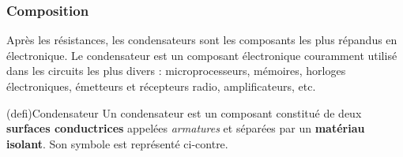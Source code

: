 \documentclass[../../main/main.tex]{subfiles}
\begin{document}
\subsubsection{Composition}

Après les résistances, les condensateurs sont les composants les plus répandus
en électronique. Le condensateur est un composant électronique couramment
utilisé dans les circuits les plus divers : microprocesseurs, mémoires, horloges
électroniques, émetteurs et récepteurs radio, amplificateurs, etc.

\begin{tcb*}[label=def:condens, sidebyside, righthand ratio=.3](defi){Condensateur}
	Un condensateur est un composant constitué de deux \textbf{surfaces
		conductrices} appelées \textit{armatures} et séparées par un
	\textbf{matériau isolant}. Son symbole est représenté ci-contre.
	\tcblower
	\begin{center}
	\end{center}
\end{tcb*}
\end{document}
